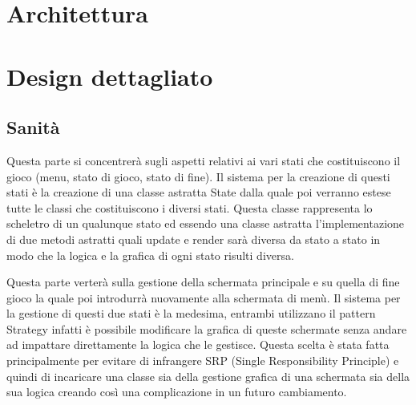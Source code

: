 \documentclass[a4paper,12pt]{report}
\begin{document}
    \section{Architettura}
    \section{Design dettagliato}
    \subsection{Sanità}
    \par Questa parte si concentrerà sugli aspetti relativi ai vari stati che costituiscono il gioco (menu, stato di gioco, stato di fine).
     Il sistema per la creazione di questi stati è la creazione di una classe astratta State dalla quale poi verranno
     estese tutte le classi che costituiscono i diversi stati. Questa classe rappresenta lo scheletro di un qualunque
     stato ed essendo una classe astratta l’implementazione di due metodi astratti quali update e render sarà diversa da
     stato a stato in modo che la logica e la grafica di ogni stato risulti diversa.
    \par Questa parte verterà sulla gestione della schermata principale e su quella di fine gioco la quale poi introdurrà nuovamente
     alla schermata di menù. Il sistema per la gestione di questi due stati è la medesima, entrambi utilizzano il pattern Strategy
     infatti è possibile modificare la grafica di queste schermate senza andare ad impattare direttamente la logica che le gestisce.
     Questa scelta è stata fatta principalmente per evitare di infrangere SRP (Single Responsibility Principle) e quindi
     di incaricare una classe sia della gestione grafica di una schermata sia della sua logica creando così una complicazione
     in un futuro cambiamento.
    \par
\end{document}
